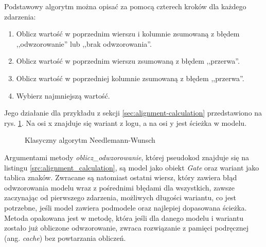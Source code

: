 Podstawowy algorytm można opisać za pomocą czterech kroków dla każdego zdarzenia:  
\begin{enumerate}
  \item Oblicz wartość w poprzednim wierszu i kolumnie zsumowaną z błędem ,,odwzorowanie'' lub ,,brak odwzorowania''.
  \item Oblicz wartość w poprzednim wierszu zsumowaną z błędem ,,przerwa''.
  \item Oblicz wartość w poprzedniej kolumnie zsumowaną z błędem ,,przerwa''.
  \item Wybierz najmniejszą wartość.
\end{enumerate}

Jego działanie dla przykładu z sekcji \ref{sec:alignment-calculation} przedstawiono na rys. \ref{fig:algo_example}. Na osi x znajduje się wariant z logu, a na osi y jest ścieżka w modelu.

\begin{figure}[H]
	\caption{\label{fig:algo_example}Klasyczny algorytm Needlemann-Wunsch \cite{NW-example}}
\end{figure}


Argumentami metody \textit{oblicz{\_}odwzorowanie}, której pseudokod znajduje się na listingu \ref{src:alignment_calculation}, są model jako obiekt \textit{Gate} oraz wariant jako tablica znaków. Zwracane są natomiast ostatni wiersz, który zawiera błąd odwzorowania modelu wraz z pośrednimi błędami dla wszystkich, zawsze zaczynając od pierwszego zdarzenia, możliwych długości wariantu, co jest potrzebne, jeśli model zawiera podmodele oraz najlepiej dopasowana ścieżka. Metoda opakowana jest w metodę, która jeśli dla danego modelu i wariantu zostało już obliczone odwzorowanie, zwraca rozwiązanie z pamięci podręcznej (ang. \textit{cache}) bez powtarzania obliczeń.

